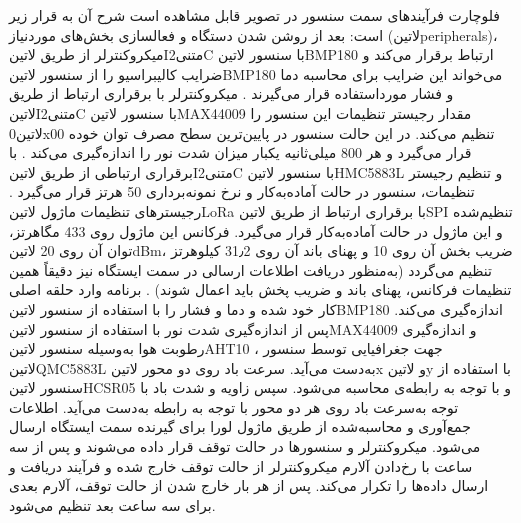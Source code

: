 فلوچارت فرآیند‌های سمت سنسور در تصویر  قابل مشاهده است شرح آن به قرار زیر است:
بعد از روشن شدن دستگاه و فعالسازی بخش‌های موردنیاز (‌لاتین{peripherals})، میکروکنترلر از طریق ‌لاتین{I‌متنی{2}C} با سنسور ‌لاتین{BMP180} ارتباط برقرار می‌کند و ضرایب کالیبراسیو را از سنسور ‌لاتین{BMP180} می‌خواند این ضرایب برای محاسبه دما و فشار مورداستفاده قرار می‌گیرند .
میکروکنترلر با برقراری ارتباط از طریق ‌لاتین{I‌متنی{2}C} با سنسور ‌لاتین{MAX44009} مقدار رجیستر تنظیمات این سنسور را ‌لاتین{0x00} تنظیم می‌کند. در این حالت سنسور در پایین‌ترین سطح مصرف توان خوده قرار می‌گیرد و هر 800 میلی‌ثانیه یکبار میزان شدت نور را اندازه‌گیری می‌کند .
با برقراری ارتباطی از طریق ‌لاتین{I‌متنی{2}C} با سنسور ‌لاتین{HMC5883L} و تنظیم رجیستر تنظیمات، سنسور در حالت آماده‌به‌کار و نرخ نمونه‌برداری 50 هرتز قرار می‌گیرد .
رجیسترهای تنظیمات ماژول ‌لاتین{LoRa} با برقراری ارتباط از طریق ‌لاتین{SPI} تنظیم‌شده و این ماژول در حالت آماده‌به‌کار قرار می‌گیرد. فرکانس این ماژول روی 433 مگاهرتز، توان آن روی 20 ‌لاتین{dBm}، ضریب بخش آن روی 10 و پهنای باند آن روی 31٫2 کیلوهرتز تنظیم می‌گردد (به‌منظور دریافت اطلاعات ارسالی در سمت ایستگاه نیز دقیقاً همین تنظیمات فرکانس، پهنای باند و ضریب پخش باید اعمال شوند) .
برنامه وارد حلقه اصلی کار خود شده و دما و فشار را با استفاده از سنسور ‌لاتین{BMP180} اندازه‌گیری می‌کند. 
پس از اندازه‌گیری شدت نور با استفاده از سنسور ‌لاتین{MAX44009}  و اندازه‌گیری رطوبت هوا به‌وسیله سنسور ‌لاتین{AHT10} ، جهت جغرافیایی توسط سنسور ‌لاتین{QMC5883L}  به‌دست می‌آید. 
سرعت باد روی دو محور ‌لاتین{x} و ‌لاتین{y} با استفاده از سنسور ‌لاتین{HCSR05} و با توجه به رابطه‌ی  محاسبه می‌شود. سپس زاویه و شدت باد با توجه به‌سرعت باد روی هر دو محور با توجه به رابطه  به‌دست می‌آید.
اطلاعات جمع‌آوری و محاسبه‌شده از طریق ماژول لورا برای گیرنده سمت ایستگاه ارسال می‌شود.
میکروکنترلر و سنسورها در حالت توقف قرار داده می‌شوند و پس از سه ساعت با رخ‌دادن آلارم میکروکنترلر از حالت توقف خارج شده و فرآیند دریافت و ارسال داده‌ها را تکرار می‌کند.
پس از هر بار خارج شدن از حالت توقف، آلارم بعدی برای سه ساعت بعد تنظیم می‌شود.

